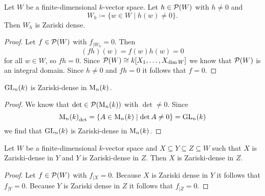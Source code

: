 \begin{lem}
  Let $W$ be a finite-dimensional $k$-vector space.
  Let $h \in \mathcal{P}(W)$ with $h \neq 0$ and
  \[
              W_h
    \coloneqq \{
                w \in W
              \mid
                h(w) \neq 0
              \}.
  \]
  Then $W_h$ is Zariski dense.
\end{lem}
\begin{proof}
  Let $f \in \mathcal{P}(W)$ with $f_{|W_h} = 0$. Then
  \[
      (fh)(w)
    = f(w)h(w)
    = 0
  \]
  for all $w \in W$, so $fh = 0$.
  Since $\mathcal{P}(W) \cong k[X_1, \dotsc, X_{\dim W}]$ we know that $\mathcal{P}(W)$ is an integral domain.
  Since $h \neq 0$ and $fh = 0$ it follows that $f = 0$.
\end{proof}


\begin{cor}
  $\operatorname{GL}_n(k)$ is Zariski-dense in $\operatorname{M}_n(k)$.
\end{cor}
\begin{proof}
  We know that $\det \in \mathcal{P}(\operatorname{M}_n(k))$ with $\det \neq 0$.
  Since
  \[
    {\operatorname{M}_n(k)}_{\det}
    = \{
        A \in \operatorname{M}_n(k)
      \mid
        \det A \neq 0
      \}
    = \operatorname{GL}_n(k)
  \]
  we find that $\operatorname{GL}_n(k)$ is Zariski-dense in $\operatorname{M}_n(k)$.
\end{proof}


\begin{prop}
  Let $W$ be a finite-dimensional $k$-vector space and $X \subseteq Y \subseteq Z \subseteq W$ such that $X$ is Zariski-dense in $Y$ and $Y$ is Zariski-dense in $Z$.
  Then $X$ is Zariski-dense in $Z$.
\end{prop}
\begin{proof}
  Let $f \in \mathcal{P}(W)$ with $f_{|X} = 0$.
  Because $X$ is Zariski dense in $Y$ it follows that $f_{|Y} = 0$.
  Because $Y$ is Zariski dense in $Z$ it follows that $f_{|Z} = 0$.
\end{proof}


